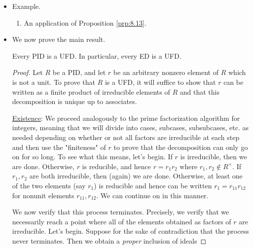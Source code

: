 \documentclass[../notes.tex]{subfiles}
\begin{document}
\begin{itemize}
\begin{proposition}
        are prime factorizations for $a$ and $b$, where $u,v$ are units, the primes $p_1,\dots,p_n$ are \emph{distinct}, and the exponents $e_i,f_i\geq 0$ ($i=1,\dots,n$). Then the element
        \begin{equation*}
            d = p_1^{\min(e_1,f_1)}\cdots p_n^{\min(e_n,f_n)}
        \end{equation*}
        (where $d=1$ if all the exponents are 0) is a gcd of $a,b$.
        \begin{proof}
            Given (not covered in class).
        \end{proof}
    \end{proposition}
    \item Example.
    \begin{enumerate}
        \item An application of Proposition \ref{prp:8.13}.
    \end{enumerate}
    \item We now prove the main result.
    \begin{theorem}\label{trm:8.14}
        Every PID is a UFD. In particular, every ED is a UFD.
        \begin{proof}
            Let $R$ be a PID, and let $r$ be an arbitrary nonzero element of $R$ which is not a unit. To prove that $R$ is a UFD, it will suffice to show that $r$ can be written as a finite product of irreducible elements of $R$ and that this decomposition is unique up to associates.\par\smallskip
            \underline{Existence}: We proceed analogously to the prime factorization algorithm for integers, meaning that we will divide into cases, subcases, subsubcases, etc. as needed depending on whether or not all factors are irreducible at each step and then use the "finiteness" of $r$ to prove that the decomposition can only go on for so long. To see what this means, let's begin. If $r$ is irreducible, then we are done. Otherwise, $r$ is reducible, and hence $r=r_1r_2$ where $r_1,r_2\notin R^\times$. If $r_1,r_2$ are both irreducible, then (again) we are done. Otherwise, at least one of the two elements (say $r_1$) is reducible and hence can be written $r_1=r_{11}r_{12}$ for nonunit elements $r_{11},r_{12}$. We can continue on in this manner.\par
            We now verify that this process terminates. Precisely, we verify that we necessarily reach a point where all of the elements obtained as factors of $r$ are irreducible. Let's begin. Suppose for the sake of contradiction that the process never terminates. Then we obtain a \emph{proper} inclusion of ideals

\end{proof}
\end{theorem}
\end{itemize}
\end{document}
